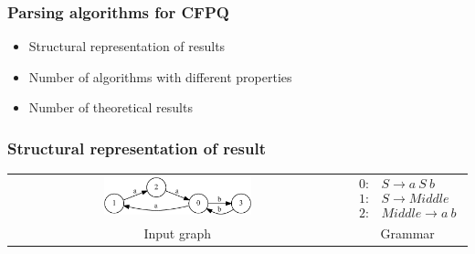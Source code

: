 \documentclass[xcolor=table]{beamer}
\begin{document}
\begin{frame} \frametitle{Parsing algorithms for CFPQ}
\begin{itemize}
\item Structural representation of results
\item Number of algorithms with different properties
\item Number of theoretical results
\end{itemize}
\end{frame}

\begin{frame}[fragile] \frametitle{Structural representation of result}
  \begin{center}
    \begin{tabular}{  c  c  }
        \includegraphics[width=0.45\textwidth]{pictures/input.pdf}
        &
    $

    \begin{array}{rl}
       0:& S \rightarrow a \ S \ b \\
       1:& S \rightarrow Middle \\
       2:& Middle \rightarrow a \ b
    \end{array}

    $
    \\
    Input graph
    &
    Grammar

    \end{tabular}
  \end{center}


\end{frame}
\end{document}
